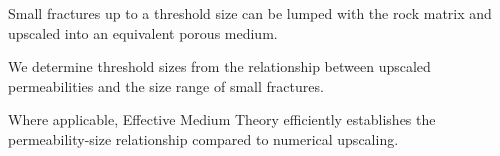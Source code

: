 \documentclass[draft]{agujournal2018}
\begin{document}




\begin{keypoints}
\item Small fractures up to a threshold size can be lumped with the rock matrix and upscaled into an equivalent porous medium.
\item We determine threshold sizes from the relationship between upscaled permeabilities and the size range of small fractures.
\item Where applicable, Effective Medium Theory efficiently establishes the permeability-size relationship compared to numerical upscaling.
\end{keypoints}

%
%

\end{document}
